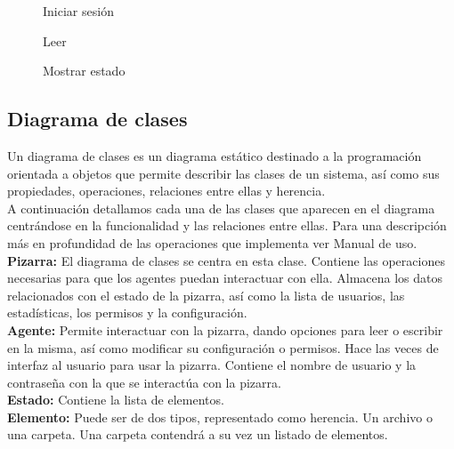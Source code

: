 \begin{figure}[!h]
\centering
\iniciarSesion\label{fig:iniciarSesion}
\caption{Iniciar sesión}
\end{figure}
\newpage

\begin{figure}[!h]
\centering
\leer\label{fig:leer}
\caption{Leer}
\end{figure}
\newpage

\begin{figure}[!h]
\centering
\mostrarEstado\label{fig:mostrarEstado}
\caption{Mostrar estado}
\end{figure}
\newpage

\subsection{Diagrama de clases}
Un diagrama de clases es un diagrama estático destinado a la programación orientada a objetos que permite describir las clases de un sistema, así como sus propiedades, operaciones, relaciones entre ellas y herencia.\\

A continuación detallamos cada una de las clases que aparecen en el diagrama centrándose en la funcionalidad y las relaciones entre ellas. Para una descripción más en profundidad de las operaciones que implementa ver Manual de uso.\\

\textbf{Pizarra:} El diagrama de clases se centra en esta clase. Contiene las operaciones necesarias para que los agentes puedan interactuar con ella. Almacena los datos relacionados con el estado de la pizarra, así como la lista de usuarios, las estadísticas, los permisos y la configuración.\\

\textbf{Agente:} Permite interactuar con la pizarra, dando opciones para leer o escribir en la misma, así como modificar su configuración o permisos. Hace las veces de interfaz al usuario para usar la pizarra. Contiene el nombre de usuario y la contraseña con la que se interactúa con la pizarra.\\

\textbf{Estado:} Contiene la lista de elementos.\\

\textbf{Elemento:} Puede ser de dos tipos, representado como herencia. Un archivo o una carpeta. Una carpeta contendrá a su vez un listado de elementos.\\

